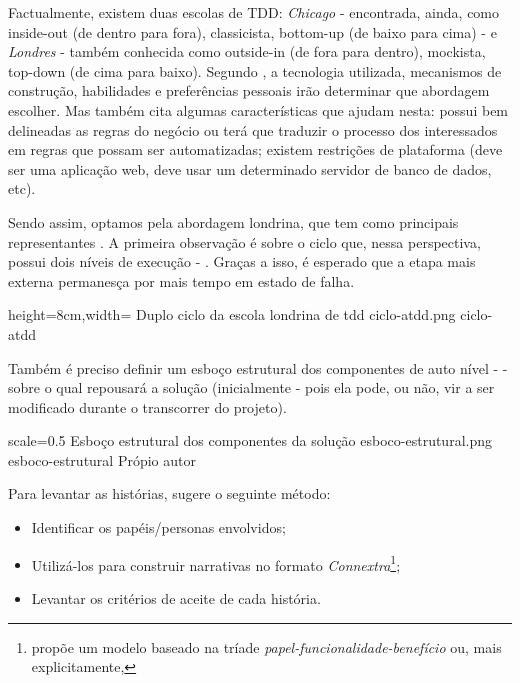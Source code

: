   Factualmente, existem duas escolas de TDD: \emph{Chicago} - encontrada, ainda, como inside-out (de dentro para fora), classicista, bottom-up (de baixo para cima) - e \emph{Londres} - também conhecida como outside-in (de fora para dentro), mockista, top-down (de cima para baixo). Segundo , a tecnologia utilizada, mecanismos de construção, habilidades e preferências pessoais irão determinar que abordagem escolher. Mas também cita algumas características que ajudam nesta: possui bem delineadas as regras do negócio ou terá que traduzir o processo dos interessados em regras que possam ser automatizadas; existem restrições de plataforma (deve ser uma aplicação web, deve usar um determinado servidor de banco de dados, etc).

  Sendo assim, optamos pela abordagem londrina, que tem como principais representantes . A primeira observação é sobre o ciclo que, nessa perspectiva, possui dois níveis de execução - . Graças a isso, é esperado que a etapa mais externa permanesça por mais tempo em estado de falha.

  \imagem
    {height=8cm,width=\textwidth}
    {Duplo ciclo da escola londrina de tdd}
    {ciclo-atdd.png}
    {ciclo-atdd}
    {\cite[pág. 40, tradução nossa]{FreemanPryce2009}\footnotemark}

  Também é preciso definir um esboço estrutural dos componentes de auto nível -  - sobre o qual repousará a solução (inicialmente - pois ela pode, ou não, vir a ser modificado durante o transcorrer do projeto).

  \imagem
    {scale=0.5}
    {Esboço estrutural dos componentes da solução}
    {esboco-estrutural.png}
    {esboco-estrutural}
    {Própio autor\footnotemark}

  Para levantar as histórias,  sugere o seguinte método:
  \begin{itemize}
    \item Identificar os papéis/personas envolvidos;
    \item Utilizá-los para construir narrativas no formato \emph{Connextra}\footnote{ propõe um modelo baseado na tríade \emph{papel-funcionalidade-benefício} ou, mais explicitamente, };
    \item Levantar os critérios de aceite de cada história.
  \end{itemize}

